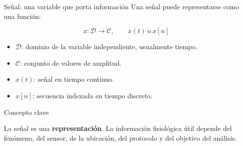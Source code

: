 \documentclass[
  10pt,
  ignorenonframetext,
  aspectratio=169,
  spanish,
]{beamer}
\providecommand{\tightlist}{%
  \setlength{\itemsep}{0pt}\setlength{\parskip}{0pt}}
\begin{document}
\begin{frame}{Señal: una variable que porta información}
\label{d1-010}
Una señal puede representarse como una función:

\[x: \mathcal{D}\rightarrow\mathcal{C},\qquad x(t)\ \text{o}\ x[n]\]

\begin{itemize}
\tightlist
\item
  \(\mathcal{D}\): dominio de la variable independiente, usualmente
  tiempo.
\item
  \(\mathcal{C}\): conjunto de valores de amplitud.
\item
  \(x(t)\): señal en tiempo continuo.
\item
  \(x[n]\): secuencia indexada en tiempo discreto.
\end{itemize}

\begin{block}{Concepto clave}

La señal es una \textbf{representación}. La información fisiológica útil
depende del fenómeno, del sensor, de la ubicación, del protocolo y del
objetivo del análisis.

\end{block}

\end{frame}
\end{document}
